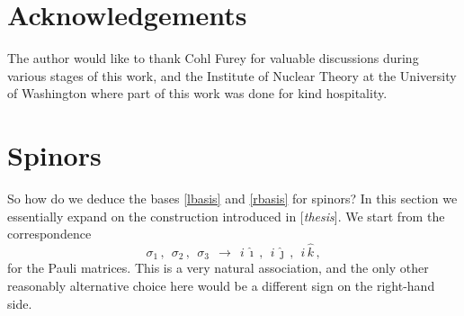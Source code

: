 \documentclass[epsfig,12pt]{article}
\newcommand{\ii}{\hat\imath}
\newcommand{\jj}{\hat\jmath}
\newcommand{\kk}{\hat k}
\begin{document}
\section*{Acknowledgements}

	The author would like to thank Cohl Furey for valuable discussions during various stages
	of this work,
	and the Institute of Nuclear Theory at the University of Washington where part of this work
	was done for kind hospitality.




\pagebreak
\appendix
\setcounter{equation}{0}


\section{Spinors}
\label{section-spinors}

	So how do we deduce the bases \eqref{lbasis} and \eqref{rbasis} for spinors?
	In this section we essentially expand on the construction introduced in [\emph{thesis}].
	We start from the correspondence
\begin{equation}
	\sigma_1\,,~~ \sigma_2\,,~~ \sigma_3	~~\to~~		i\,\ii\,,~~ i\,\jj\,,~~ i\,\kk\,,
\end{equation}
	for the Pauli matrices.
	This is a very natural association, and the only other reasonably alternative choice here
	would be a different sign on the right-hand side.
\end{document}
